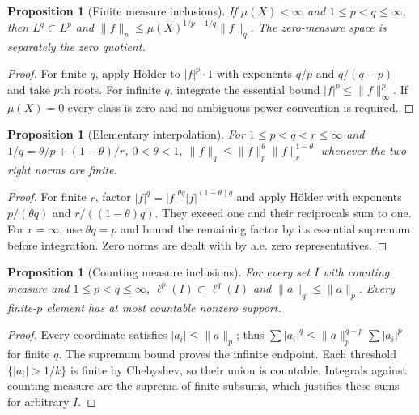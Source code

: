 \documentclass[11pt,oneside,openany]{book}
\newtheorem{proposition}[theorem]{Proposition}
\theoremstyle{definition}
\theoremstyle{remark}
\newcommand{\family}[1]{}
\begin{document}
\begin{proposition}[Finite measure inclusions]\family{D11.10.finite_measure_inclusion}\label{d11:10:finite-measure-inclusion}
If $\mu(X)<\infty$ and $1\leq p<q\leq\infty$, then
$L^q\subset L^p$ and
$\|f\|_p\leq\mu(X)^{1/p-1/q}\|f\|_q$.
The zero-measure space is separately the zero quotient.
\end{proposition}
\begin{proof}
For finite $q$, apply H\"older to $|f|^p\cdot1$ with exponents
$q/p$ and $q/(q-p)$ and take $p$th roots. For infinite $q$, integrate
the essential bound $|f|^p\leq\|f\|_\infty^p$. If $\mu(X)=0$ every
class is zero and no ambiguous power convention is required.
\end{proof}

\begin{proposition}[Elementary interpolation]\family{D11.10.elementary_norm_interpolation}\label{d11:10:elementary-norm-interpolation}
For $1\leq p<q<r\leq\infty$ and
$1/q=\theta/p+(1-\theta)/r$, $0<\theta<1$,
$\|f\|_q\leq\|f\|_p^\theta\|f\|_r^{1-\theta}$ whenever the two
right norms are finite.
\end{proposition}
\begin{proof}
For finite $r$, factor $|f|^q=|f|^{\theta q}|f|^{(1-\theta)q}$ and
apply H\"older with exponents $p/(\theta q)$ and
$r/((1-\theta)q)$. They exceed one and their reciprocals sum to one.
For $r=\infty$, use $\theta q=p$ and bound the remaining factor by its
essential supremum before integration. Zero norms are dealt with by a.e.
zero representatives.
\end{proof}

\begin{proposition}[Counting measure inclusions]\family{D11.10.sequence_space_inclusion}\label{d11:10:sequence-space-inclusion}
For every set $I$ with counting measure and $1\leq p<q\leq\infty$,
$\ell^p(I)\subset\ell^q(I)$ and $\|a\|_q\leq\|a\|_p$.
Every finite-$p$ element has at most countable nonzero support.
\end{proposition}
\begin{proof}
Every coordinate satisfies $|a_i|\leq\|a\|_p$; thus
$\sum|a_i|^q\leq\|a\|_p^{q-p}\sum|a_i|^p$ for finite $q$.
The supremum bound proves the infinite endpoint. Each threshold
$\{|a_i|>1/k\}$ is finite by Chebyshev, so their union is countable.
Integrals against counting measure are the suprema of finite subsums,
which justifies these sums for arbitrary $I$.
\end{proof}
\end{document}
